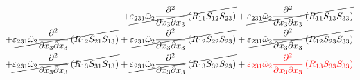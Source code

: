 \begin{equation}
\begin{split}
		+\cancel{\varepsilon_{231}\tilde{\omega}_{2}\pdv{}{x_{3}}{x_{3}}\left(R_{11}S_{12}S_{23}\right)}
		+\cancel{\varepsilon_{231}\tilde{\omega}_{2}\pdv{}{x_{3}}{x_{3}}\left(R_{11}S_{13}S_{33}\right)}\\
		+\cancel{\varepsilon_{231}\tilde{\omega}_{2}\pdv{}{x_{3}}{x_{3}}\left(R_{12}S_{21}S_{13}\right)}
		+\cancel{\varepsilon_{231}\tilde{\omega}_{2}\pdv{}{x_{3}}{x_{3}}\left(R_{12}S_{22}S_{23}\right)}
		+\cancel{\varepsilon_{231}\tilde{\omega}_{2}\pdv{}{x_{3}}{x_{3}}\left(R_{12}S_{23}S_{33}\right)}\\
		+\cancel{\varepsilon_{231}\tilde{\omega}_{2}\pdv{}{x_{3}}{x_{3}}\left(R_{13}S_{31}S_{13}\right)}
		+\cancel{\varepsilon_{231}\tilde{\omega}_{2}\pdv{}{x_{3}}{x_{3}}\left(R_{13}S_{32}S_{23}\right)}
		+{\color{red}\varepsilon_{231}\tilde{\omega}_{2}\pdv{}{x_{3}}{x_{3}}\left(R_{13}S_{33}S_{33}\right)}\\
	\end{split}
\end{equation}
